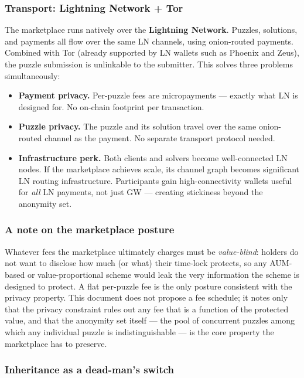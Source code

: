 \documentclass[a4paper,11pt]{article}
\begin{document}
\subsubsection{Transport: Lightning Network + Tor}

The marketplace runs natively over the \textbf{Lightning Network}. Puzzles, solutions, and payments all flow over the same LN channels, using onion-routed payments. Combined with Tor (already supported by LN wallets such as Phoenix and Zeus), the puzzle submission is unlinkable to the submitter. This solves three problems simultaneously:

\begin{itemize}[nosep,leftmargin=1.5em]
  \item \textbf{Payment privacy.} Per-puzzle fees are micropayments --- exactly what LN is designed for. No on-chain footprint per transaction.
  \item \textbf{Puzzle privacy.} The puzzle and its solution travel over the same onion-routed channel as the payment. No separate transport protocol needed.
  \item \textbf{Infrastructure perk.} Both clients and solvers become well-connected LN nodes. If the marketplace achieves scale, its channel graph becomes significant LN routing infrastructure. Participants gain high-connectivity wallets useful for \textit{all} LN payments, not just GW --- creating stickiness beyond the anonymity set.
\end{itemize}

\subsubsection{A note on the marketplace posture}

Whatever fees the marketplace ultimately charges must be \emph{value-blind}: holders do not want to disclose how much (or what) their time-lock protects, so any AUM-based or value-proportional scheme would leak the very information the scheme is designed to protect. A flat per-puzzle fee is the only posture consistent with the privacy property. This document does not propose a fee schedule; it notes only that the privacy constraint rules out any fee that is a function of the protected value, and that the anonymity set itself --- the pool of concurrent puzzles among which any individual puzzle is indistinguishable --- is the core property the marketplace has to preserve.

\subsubsection{Inheritance as a dead-man's switch}
\label{sec:inheritance}
\end{document}
